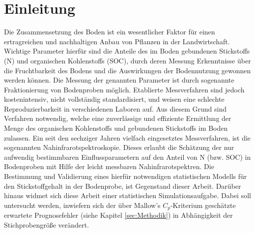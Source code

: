 \section{Einleitung}
\label{sec:Einleitung}
    Die Zusammensetzung des Boden ist ein wesentlicher Faktor für einen ertragreichen und nachhaltigen Anbau von Pflanzen in der Landwirtschaft.
    Wichtige Parameter hierfür sind die Anteile des im Boden gebundenen Stickstoffs (N) und organischen Kohlenstoffs (SOC), durch deren Messung Erkenntnisse über die Fruchtbarkeit des Bodens und die Auswirkungen der Bodennutzung gewonnen werden können.\cite{Poeplau2013}
    Die Messung der genannten Parameter ist durch sogenannte Fraktionierung von Bodenproben möglich.
    Etablierte Messverfahren sind jedoch kostenintensiv, nicht vollständig standardisiert, und weisen eine schlechte Reproduzierbarkeit in verschiedenen Laboren auf.\cite{Poeplau2013}
    Aus diesem Grund sind Verfahren notwendig, welche eine zuverlässige und effiziente Ermittlung der Menge des organischen Kohlenstoffs und gebundenen Stickstoffs im Boden zulassen.
    Ein seit den sechziger Jahren vielfach eingesetztes Messverfahren, ist die sogenannten Nahinfrarotspektroskopie.\cite{Agelet2010}
    Dieses erlaubt die Schätzung der nur aufwendig bestimmbaren Einflussparametern auf den Anteil von N (bzw. SOC) in Bodenproben mit Hilfe der leicht messbaren Nahinfrarotspektren.
    Die Bestimmung und Validierung eines hierfür notwendigen statistischen Modells für den Stickstoffgehalt in der Bodenprobe, ist Gegenstand dieser Arbeit.
    Darüber hinaus widmet sich diese Arbeit einer statistischen Simulationsaufgabe.
    Dabei soll untersucht werden, inwiefern sich der über Mallow's $C_p$-Kriterium geschätzte erwartete Prognosefehler (siehe Kapitel \ref{sec:Methodik}) in Abhängigkeit der Stichprobengröße verändert.


